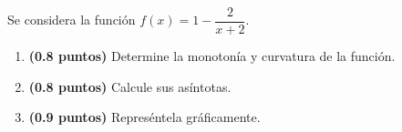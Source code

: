 
Se considera la función $f(x)=1-\dfrac{2}{x+2}$.
\begin{enumerate}[label=\alph*)]
\item \textbf{(0.8 puntos)} Determine la monotonía y curvatura de la función.
\item \textbf{(0.8 puntos)} Calcule sus asíntotas.
\item \textbf{(0.9 puntos)} Represéntela gráficamente.
\end{enumerate}
